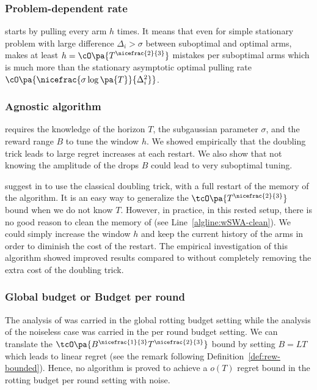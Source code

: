 \subsubsection{Problem-dependent rate}
\SWA starts by pulling every arm $h$ times. It means that even for simple stationary problem with large difference $\Delta_i > \sigma$ between suboptimal and optimal arms, \SWA makes at least $h = \cO\pa{T^{\nicefrac{2}{3}}}$ mistakes per suboptimal arms which is much more than the stationary asymptotic optimal pulling rate $\cO\pa{\nicefrac{\sigma\log\pa{T}}{\Delta_i^2}}$.


\subsubsection{Agnostic algorithm}
\SWA requires the knowledge of the horizon $T$, the subgaussian parameter $\sigma$, and the reward range $B$  to tune the window $h$. We showed empirically that the doubling trick leads to large regret increases at each restart. We also show that not knowing the amplitude of the drops $B$ could lead to very suboptimal tuning.

\begin{remark}
\citet{levine2017rotting} suggest in \wSWA to use the classical doubling trick, with a full restart of the memory of the algorithm. It is an easy way to generalize the $\tcO\pa{T^{\nicefrac{2}{3}}}$ bound when we do not know $T$. However, in practice, in this rested setup, there is no good reason to clean the memory of \wSWA (see Line~\ref{algline:wSWA-clean}). We could simply increase the window $h$ and keep the current history of the arms in order to diminish the cost of the restart. The empirical investigation of this algorithm showed improved results compared to \wSWA without completely removing the extra cost of the doubling trick.
\end{remark}


\subsubsection{Global budget or Budget per round}

The analysis of \SWA was carried in the global rotting budget setting while the analysis of the noiseless case was carried in the per round budget setting. We can translate the $\tcO\pa{B^{\nicefrac{1}{3}}T^{\nicefrac{2}{3}}}$ bound by setting $B= LT$ which leads to linear regret (see the remark following Definition~\ref{def:rew-bounded}). Hence, no algorithm is proved to achieve a $o(T)$ regret bound in the rotting budget per round setting with noise.
